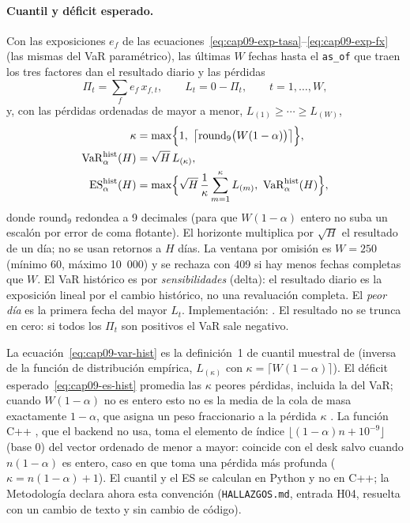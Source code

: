 \paragraph{Cuantil y déficit esperado.} Con las exposiciones $e_f$ de las ecuaciones~\eqref{eq:cap09-exp-tasa}--\eqref{eq:cap09-exp-fx} (las mismas del VaR paramétrico), las últimas $W$ fechas hasta el \texttt{as\_of} que traen los tres factores dan el resultado diario y las pérdidas
\begin{equation}\label{eq:cap09-pnl-hist}
  \Pi_t=\sum_{f}e_f\,x_{f,t},\qquad L_t=0-\Pi_t,\qquad t=1,\dots,W,
\end{equation}
y, con las pérdidas ordenadas de mayor a menor, $L_{(1)}\ge\cdots\ge L_{(W)}$,
\begin{align}
  \kappa&=\max\Bigl\{1,\ \bigl\lceil\mathrm{round}_{9}\bigl(W(1-\alpha)\bigr)\bigr\rceil\Bigr\},\label{eq:cap09-k}\\
  \VaR{\alpha}^{\mathrm{hist}}(H)&=\sqrt{H}\,L_{(\kappa)},\label{eq:cap09-var-hist}\\
  \ES{\alpha}^{\mathrm{hist}}(H)&=\max\Bigl\{\sqrt{H}\,\frac1\kappa\sum_{m=1}^{\kappa}L_{(m)},\ \VaR{\alpha}^{\mathrm{hist}}(H)\Bigr\},\label{eq:cap09-es-hist}
\end{align}
donde $\mathrm{round}_9$ redondea a 9 decimales (para que $W(1-\alpha)$ entero no suba un escalón por error de coma flotante). El horizonte multiplica por $\sqrt H$ el resultado de un día; no se usan retornos a $H$ días. La ventana por omisión es $W=250$ (mínimo 60, máximo 10~000) y se rechaza con 409 si hay menos fechas completas que $W$. El VaR histórico es por \emph{sensibilidades} (delta): el resultado diario es la exposición lineal por el cambio histórico, no una revaluación completa. El \emph{peor día} es la primera fecha del mayor $L_t$. Implementación: . El resultado no se trunca en cero: si todos los $\Pi_t$ son positivos el VaR sale negativo.

\begin{diferencia}
  La ecuación~\eqref{eq:cap09-var-hist} es la definición~1 de cuantil muestral de \citet{hyndman1996} (inversa de la función de distribución empírica, $L_{(\kappa)}$ con $\kappa=\lceil W(1-\alpha)\rceil$). El déficit esperado~\eqref{eq:cap09-es-hist} promedia las $\kappa$ peores pérdidas, incluida la del VaR; cuando $W(1-\alpha)$ no es entero esto no es la media de la cola de masa exactamente $1-\alpha$, que asigna un peso fraccionario a la pérdida $\kappa$ \citep{acerbi2002}. La función C++ , que el backend no usa, toma el elemento de índice $\lfloor (1-\alpha)n+10^{-9}\rfloor$ (base 0) del vector ordenado de menor a mayor: coincide con el desk salvo cuando $n(1-\alpha)$ es entero, caso en que toma una pérdida más profunda ($\kappa=n(1-\alpha)+1$). El cuantil y el ES se calculan en Python y no en C++; la Metodología declara ahora esta convención (\texttt{HALLAZGOS.md}, entrada H04, resuelta con un cambio de texto y sin cambio de código).
\end{diferencia}

